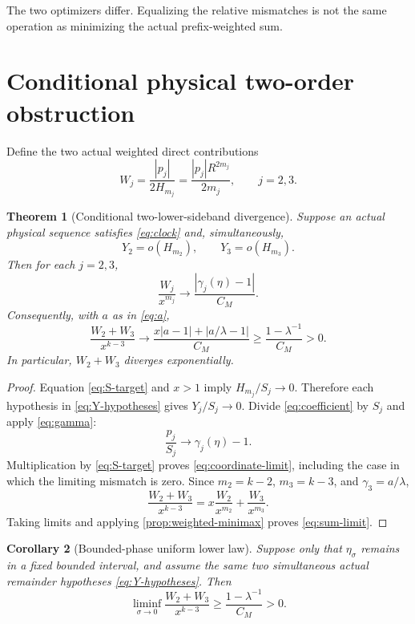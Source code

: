 \documentclass[11pt]{article}
\newtheorem{theorem}{Theorem}[section]
\newtheorem{corollary}[theorem]{Corollary}
\theoremstyle{remark}
\begin{document}
The two optimizers differ.  Equalizing the relative mismatches is not the
same operation as minimizing the actual prefix-weighted sum.

\section{Conditional physical two-order obstruction}

Define the two actual weighted direct contributions
\begin{equation}\label{eq:W}
 W_j=\frac{|p_j|}{2H_{m_j}}
 =\frac{|p_j|R^{2m_j}}{2m_j},\qquad j=2,3.
\end{equation}

\begin{theorem}[Conditional two-lower-sideband divergence]
\label{thm:conditional}
Suppose an actual physical sequence satisfies \eqref{eq:clock} and,
simultaneously,
\begin{equation}\label{eq:Y-hypotheses}
 \boxed{
 Y_2=o(H_{m_2}),\qquad Y_3=o(H_{m_3}).}
\end{equation}
Then for each $j=2,3$,
\begin{equation}\label{eq:coordinate-limit}
 \frac{W_j}{x^{m_j}}
 \longrightarrow\frac{|\gamma_j(\eta)-1|}{C_M}.
\end{equation}
Consequently, with $a$ as in \eqref{eq:a},
\begin{equation}\label{eq:sum-limit}
 \boxed{
 \frac{W_2+W_3}{x^{k-3}}
 \longrightarrow
 \frac{x|a-1|+|a/\lambda-1|}{C_M}
 \ge\frac{1-\lambda^{-1}}{C_M}>0.}
\end{equation}
In particular, $W_2+W_3$ diverges exponentially.
\end{theorem}

\begin{proof}
Equation \eqref{eq:S-target} and $x>1$ imply
$H_{m_j}/S_j\to0$.  Therefore each hypothesis in
\eqref{eq:Y-hypotheses} gives $Y_j/S_j\to0$.  Divide
\eqref{eq:coefficient} by $S_j$ and apply \eqref{eq:gamma}:
\[
 \frac{p_j}{S_j}\longrightarrow\gamma_j(\eta)-1.
\]
Multiplication by \eqref{eq:S-target} proves
\eqref{eq:coordinate-limit}, including the case in which the limiting
mismatch is zero.  Since $m_2=k-2$, $m_3=k-3$, and
$\gamma_3=a/\lambda$,
\[
 \frac{W_2+W_3}{x^{k-3}}
 =x\frac{W_2}{x^{m_2}}+\frac{W_3}{x^{m_3}}.
\]
Taking limits and applying \cref{prop:weighted-minimax} proves
\eqref{eq:sum-limit}.
\end{proof}

\begin{corollary}[Bounded-phase uniform lower law]
\label{cor:bounded-phase}
Suppose only that $\eta_\sigma$ remains in a fixed bounded interval, and
assume the same two simultaneous actual remainder hypotheses
\eqref{eq:Y-hypotheses}.  Then
\begin{equation}\label{eq:liminf}
 \boxed{
 \liminf_{\sigma\to0}
 \frac{W_2+W_3}{x^{k-3}}
 \ge \frac{1-\lambda^{-1}}{C_M}>0.}
\end{equation}
\end{corollary}
\end{document}
